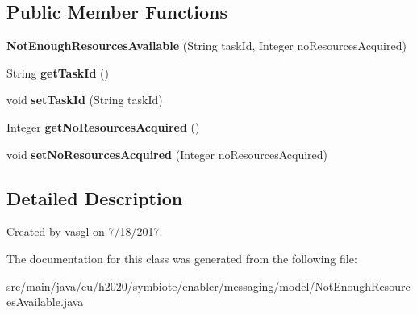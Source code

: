 \subsection*{Public Member Functions}
\begin{DoxyCompactItemize}
\item 
\mbox{\label{classeu_1_1h2020_1_1symbiote_1_1enabler_1_1messaging_1_1model_1_1NotEnoughResourcesAvailable_aaa2f5d5a0e46293ca4c7a9e6822bb98c}} 
{\bfseries Not\+Enough\+Resources\+Available} (String task\+Id, Integer no\+Resources\+Acquired)
\item 
\mbox{\label{classeu_1_1h2020_1_1symbiote_1_1enabler_1_1messaging_1_1model_1_1NotEnoughResourcesAvailable_a0d9582c0071e76f2c11ff88c049da749}} 
String {\bfseries get\+Task\+Id} ()
\item 
\mbox{\label{classeu_1_1h2020_1_1symbiote_1_1enabler_1_1messaging_1_1model_1_1NotEnoughResourcesAvailable_a96fb2e7a3f5b2316a0acd78d328d7e5c}} 
void {\bfseries set\+Task\+Id} (String task\+Id)
\item 
\mbox{\label{classeu_1_1h2020_1_1symbiote_1_1enabler_1_1messaging_1_1model_1_1NotEnoughResourcesAvailable_aa382071babfbca891542df7b9eae7825}} 
Integer {\bfseries get\+No\+Resources\+Acquired} ()
\item 
\mbox{\label{classeu_1_1h2020_1_1symbiote_1_1enabler_1_1messaging_1_1model_1_1NotEnoughResourcesAvailable_a605c3039255b5fb068dc2f29f88a282b}} 
void {\bfseries set\+No\+Resources\+Acquired} (Integer no\+Resources\+Acquired)
\end{DoxyCompactItemize}


\subsection{Detailed Description}
Created by vasgl on 7/18/2017. 

The documentation for this class was generated from the following file\+:\begin{DoxyCompactItemize}
\item 
src/main/java/eu/h2020/symbiote/enabler/messaging/model/Not\+Enough\+Resources\+Available.\+java\end{DoxyCompactItemize}
